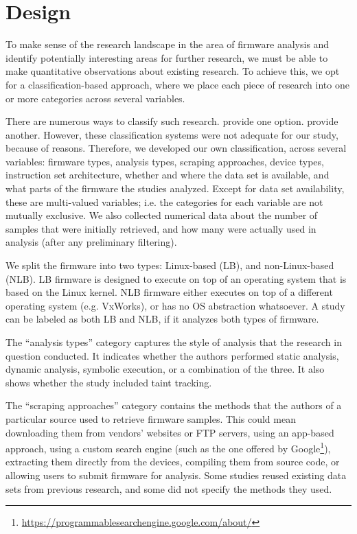 \section{Design}\label{sec:design}
To make sense of the research landscape in the area of firmware analysis and identify potentially interesting areas for further research, we must be able to make quantitative observations about existing research.
To achieve this, we opt for a classification-based approach, where we place each piece of research into one or more categories across several variables.

There are numerous ways to classify such research.
\textcite{muench2018what} provide one option.
\textcite{costin2014large} provide another.
However, these classification systems were not adequate for our study, because of reasons.
Therefore, we developed our own classification, across several variables: firmware types, analysis types, scraping approaches, device types, instruction set architecture, whether and where the data set is available, and what parts of the firmware the studies analyzed.
Except for data set availability, these are multi-valued variables; i.e. the categories for each variable are not mutually exclusive.
We also collected numerical data about the number of samples that were initially retrieved, and how many were actually used in analysis (after any preliminary filtering).

We split the firmware into two types: Linux-based (LB), and non-Linux-based (NLB).
LB firmware is designed to execute on top of an operating system that is based on the Linux kernel.
NLB firmware either executes on top of a different operating system (e.g. VxWorks), or has no OS abstraction whatsoever.
A study can be labeled as both LB and NLB, if it analyzes both types of firmware.

The ``analysis types'' category captures the style of analysis that the research in question conducted.
It indicates whether the authors performed static analysis, dynamic analysis, symbolic execution, or a combination of the three.
It also shows whether the study included taint tracking.

The ``scraping approaches'' category contains the methods that the authors of a particular source used to retrieve firmware samples.
This could mean downloading them from vendors' websites or FTP servers, using an app-based approach, using a custom search engine (such as the one offered by Google\footnote{\url{https://programmablesearchengine.google.com/about/}}), extracting them directly from the devices, compiling them from source code, or allowing users to submit firmware for analysis.
Some studies reused existing data sets from previous research, and some did not specify the methods they used.

